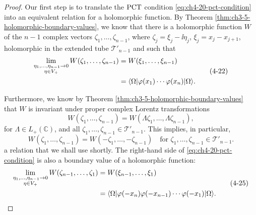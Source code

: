 \begin{proof}
Our first step is to translate the $\mathrm{PCT}$ condition \eqref{eq:ch4-20-pct-condition} into an equivalent
relation for a holomorphic function. By Theorem \ref{thm:ch3-5-holomorphic-boundary-values}, we know that there is a
holomorphic function $W$ of the $n-1$ complex vectors
$\zeta_1,\ldots,\zeta_{n-1}$, where $\zeta_j=\xi_j-\ii\eta_j$,
$\xi_j=x_j-x_{j+1}$, holomorphic in the extended tube
$\mathcal{T}'_{n-1}$ and such that
\begin{equation}
\begin{aligned}
  \lim_{\substack{\eta_1,\ldots,\eta_{n-1}\to0\\
                   \eta\in V_+}}
  W(\zeta_1,\ldots,\zeta_{n-1})
  &=W(\xi_1,\ldots,\xi_{n-1}) \\
  &=\langle \Omega\rvert\varphi(x_1)\cdots\varphi(x_n)\lvert \Omega\rangle.
\end{aligned}
\tag{4-22}\label{eq:ch4-22-forward-boundary-value}
\end{equation}

Furthermore, we know by Theorem \ref{thm:ch3-5-holomorphic-boundary-values} that $W$ is invariant under proper complex
Lorentz transformations
\begin{equation}
  W(\zeta_1,\ldots,\zeta_{n-1})
  =W(\Lambda\zeta_1,\ldots,\Lambda\zeta_{n-1}),
  \tag{4-23}\label{eq:ch4-23-lorentz-invariance}
\end{equation}
for $\Lambda\in L_+(\mathbb C)$, and all
$\zeta_1,\ldots,\zeta_{n-1}\in\mathcal{T}'_{n-1}$. This implies, in particular,
\begin{equation}
  W(\zeta_1,\ldots,\zeta_{n-1})
  =W(-\zeta_1,\ldots,-\zeta_{n-1})
  \quad\text{for }\zeta_1,\ldots,\zeta_{n-1}\in\mathcal{T}'_{n-1}.
  \tag{4-24}\label{eq:ch4-24-sign-reversal}
\end{equation}
a relation that we shall use shortly. The right-hand side of \eqref{eq:ch4-20-pct-condition} is also a
boundary value of a holomorphic function:
\begin{equation}
\begin{aligned}
  \lim_{\substack{\eta_1,\ldots,\eta_{n-1}\to0\\
                   \eta\in V_+}}
  W(\zeta_{n-1},\ldots,\zeta_1)
  &=W(\xi_{n-1},\ldots,\xi_1) \\
  &=\langle \Omega\rvert\varphi(-x_n)\varphi(-x_{n-1})\cdots
    \varphi(-x_1)\lvert \Omega\rangle.
\end{aligned}
\tag{4-25}\label{eq:ch4-25-reversed-boundary-value}
\end{equation}


\end{proof}
